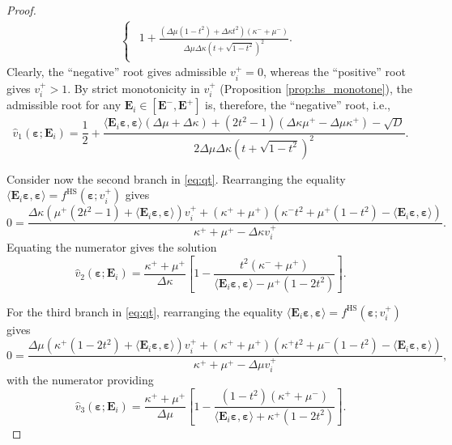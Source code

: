 \documentclass[10pt,a4paper]{amsart}
\newcommand{\Ei}{\tensf{E}_i}                       %
\newcommand{\Emax}{\tensf{E}^{+}}                   %
\newcommand{\Emin}{\tensf{E}^{-}}                   %
\newcommand{\strain}{\tenss{\varepsilon}}           %
\newcommand{\tensf}[1]{\bm{\mathbf{#1}}}            %
\newcommand{\tenss}[1]{\bm{\mathbf{#1}}}            %
\begin{document}
\begin{proof}
\begin{multline}
\begin{cases}
        \begin{aligned}1 + \frac{(\Delta\mu (1-t^2) + \Delta\kappa t^2)(\kappa^- + \mu^-)}{\Delta\mu \Delta\kappa (t + \sqrt{1-t^2})^2 }.\end{aligned}
    \end{cases}
\end{multline}
%
Clearly, the ``negative'' root gives admissible $v_i^+ = 0$, whereas the ``positive'' root gives $v_i^+ > 1$. By strict monotonicity in $v_i^+$ (Proposition \ref{prop:hs_monotone}), the admissible root for any $\Ei \in [\Emin, \Emax]$ is, therefore, the ``negative'' root, i.e.,
%
\begin{equation}
    \hat{v}_1 (\strain;\Ei) =
        \frac{1}{2} + \frac{\langle\Ei\strain, \strain\rangle(\Delta\mu + \Delta\kappa) + (2t^2-1)(\Delta\kappa \mu^+ -\Delta\mu \kappa^+) - \sqrt{D}}{2 \Delta\mu \Delta\kappa (t + \sqrt{1 - t^2})^2}.
\end{equation}

Consider now the second branch in \eqref{eq:qt}. Rearranging the equality $\langle \Ei \strain, \strain\rangle = f^{\mathrm{HS}}(\strain;v_i^+)$ gives
%
\begin{equation}
    0 = \frac{\Delta\kappa (\mu^+ (2t^2 -1) + \langle\Ei\strain, \strain\rangle)v_i^+ +(\kappa^+ + \mu^+) (\kappa^- t^2 + \mu^+ (1-t^2) - \langle\Ei\strain, \strain\rangle)}{\kappa^+ + \mu^+ - \Delta\kappa v_i^+}.
\end{equation}
%
Equating the numerator gives the solution
%
\begin{equation}
    \hat{v}_2 (\strain;\Ei) = \frac{\kappa^+ + \mu^+}{\Delta\kappa}\left[1 - \frac{t^2 (\kappa^- + \mu^+)}{ \langle\Ei\strain, \strain\rangle - \mu^+ (1 - 2t^2)}\right].
\end{equation}

For the third branch in \eqref{eq:qt}, rearranging the equality $\langle \Ei \strain, \strain\rangle = f^{\mathrm{HS}}(\strain;v_i^+)$ gives
%
\begin{equation}
    0 = \frac{\Delta\mu (\kappa^+ (1-2t^2) + \langle\Ei\strain, \strain\rangle)v_i^+ + (\kappa^+ + \mu^+) (\kappa^+ t^2 + \mu^- (1-t^2) - \langle\Ei\strain, \strain\rangle) }{\kappa^+ + \mu^+ - \Delta\mu v_i^+},
\end{equation}
%
with the numerator providing
%
\begin{equation}
    \hat{v}_3 (\strain;\Ei) = \frac{\kappa^+ + \mu^+}{\Delta\mu} \left[1 - \frac{(1-t^2) (\kappa^+ + \mu^-)}{\langle\Ei\strain, \strain\rangle + \kappa^+ (1 - 2t^2)}\right].
\end{equation}
\end{proof}
\end{document}
